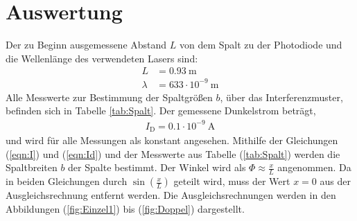 \section{Auswertung}
\label{sec:Auswertung}
Der zu Beginn ausgemessene Abstand $L$ von dem Spalt zu der Photodiode und die Wellenlänge des verwendeten Lasers sind:
\begin{align*}
  L &= 0.93 \ \text{m} \\
  \lambda &= 633 \cdot 10^{-9} \ \text{m}
\end{align*}
Alle Messwerte zur Bestimmung der Spaltgrößen $b$, über das Interferenzmuster, befinden sich in Tabelle \ref{tab:Spalt}. Der gemessene Dunkelstrom beträgt,
\begin{align*}
  I_\text{D} = 0.1 \cdot 10^{-9} \ \text{A}
\end{align*}
und wird für alle Messungen als konstant angesehen. Mithilfe der Gleichungen (\ref{eqn:I}) und (\ref{eqn:Id}) und der Messwerte aus Tabelle (\ref{tab:Spalt}) werden die Spaltbreiten $b$ der Spalte bestimmt. Der Winkel wird als $\Phi \approx \frac{x}{L}$ angenommen. Da in beiden Gleichungen durch $\sin\left(\frac{x}{L} \right)$ geteilt wird, muss der Wert $x = 0$ aus der Ausgleichsrechnung entfernt werden. Die Ausgleichsrechnungen werden in den Abbildungen (\ref{fig:Einzel1}) bis (\ref{fig:Doppel}) dargestellt.

